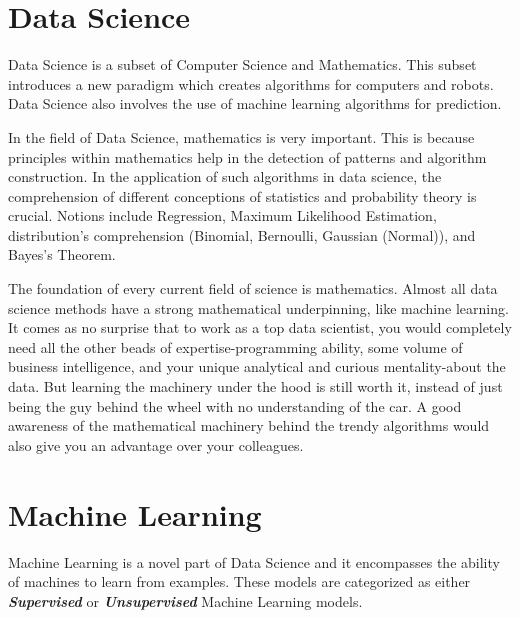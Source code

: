 \section{Data Science}





Data Science is a subset of Computer Science and Mathematics. This subset introduces a new paradigm which creates algorithms for computers and robots. Data Science also involves the use of machine learning algorithms for prediction.


In the field of Data Science, mathematics is very important. This is because principles within mathematics help in the detection of patterns and algorithm construction. In the application of such algorithms in data science, the comprehension of different conceptions of statistics and probability theory is crucial. Notions include Regression, Maximum Likelihood Estimation, distribution's comprehension (Binomial, Bernoulli, Gaussian (Normal)), and Bayes's Theorem.

The foundation of every current field of science is mathematics. Almost all data science methods have a strong mathematical underpinning, like machine learning.
It comes as no surprise that to work as a top data scientist, you would completely need all the other beads of expertise-programming ability, some volume of business intelligence, and your unique analytical and curious mentality-about the data. But learning the machinery under the hood is still worth it, instead of just being the guy behind the wheel with no understanding of the car. A good awareness of the mathematical machinery behind the trendy algorithms would also give you an advantage over your colleagues.

\section{Machine Learning}

Machine Learning is a novel part of Data Science and it encompasses the ability of machines to learn from examples. These models are categorized as either \textbf{\textit{Supervised}} or \textbf{\textit{Unsupervised}} Machine Learning models. 


